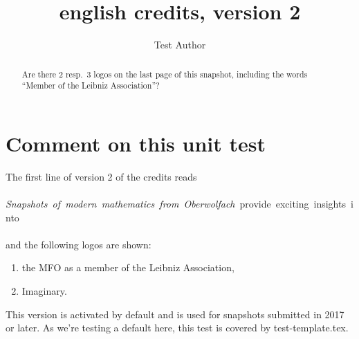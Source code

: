 \documentclass{snapshotmfo}
\author{Test Author}
\title{english credits, version 2}
\begin{document}
\begin{abstract}
Are there 2 resp.\ 3 logos on the last page of this snapshot, including the words ``Member of the Leibniz Association''?
\end{abstract}

\section{Comment on this unit test}
The first line of version 2 of the credits reads\\
\\
\hbox{\emph{Snapshots of modern mathematics from Oberwolfach} provide exciting insights into}\\
\\
and the following logos are shown:
\begin{enumerate}
  \item the MFO as a member of the Leibniz Association,
  \item Imaginary.
\end{enumerate}
This version is activated by default 
and is used for snapshots submitted in 2017 or later.
As we're testing a default here, this test is covered by test-template.tex.
\end{document}
